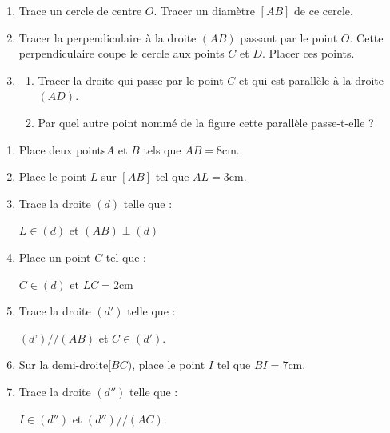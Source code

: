 \documentclass[a4paper,10pt]{report}
\begin{document}
\begin{ex}

\medskip
\begin{enumerate}
\item Trace un cercle de centre $O$.
Tracer un diamètre $[AB]$ de ce cercle.
\item Tracer la perpendiculaire à la droite $(AB)$ passant par le point $O$. Cette perpendiculaire coupe le cercle aux points $C$ et $D$. Placer ces points.
\item \begin{enumerate}
\item Tracer la droite qui passe par le point $C$ et qui est parallèle à la droite $(AD)$.
\item Par quel autre point nommé de la figure cette parallèle passe-t-elle ?
\end{enumerate}
\end{enumerate}
\end{ex}

\begin{ex}

\medskip
\begin{enumerate}
\item Place deux points$ A$ et $B$ tels que $AB=8$cm.
\item Place le point $L$ sur $[AB]$ tel que $AL=3$cm.
\item Trace la droite $(d)$ telle que :
\begin{center}
$L\in (d)$ et $(AB)\perp (d)$
\end{center}
\item Place un point $C$ tel que :
\begin{center}
$C\in (d)$ et $LC= 2$cm
\end{center}
\item Trace la droite $(d')$ telle que :
\begin{center}
$(d’)//(AB)$ et $C\in (d')$.
\end{center}
\item Sur la demi-droite$ [BC)$, place le point $I$ tel que $BI=7$cm.
\item Trace la droite $(d'')$ telle que :
\begin{center}
$I\in (d'')$ et $(d'')//(AC)$.
\end{center}
\end{enumerate}
\end{ex}
\end{document}
